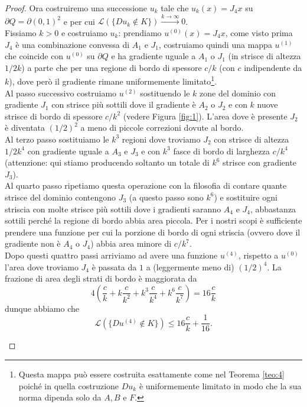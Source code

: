 \documentclass[a4paper,11pt]{book}
\theoremstyle{plain}
\theoremstyle{definition}
\theoremstyle{remark}
\newcommand{\LL}{\mathscr{L}}
\begin{document}
\begin{proof}
	Ora costruiremo una successione $u_k$ tale che $u_k(x) = J_4x$ su $\partial Q = \partial (0,1)^2$ e per cui $\LL(\{Du_k\not\in K\})\xrightarrow{k\to\infty}0$.\\
	Fissiamo $k>0$ e costruiamo $u_k$: prendiamo $u^{(0)}(x) = J_4x$, come visto prima $J_4$ è una combinazione convessa di $A_1$ e $J_1$, costruiamo quindi una mappa $u^{(1)}$ che coincide con $u^{(0)}$ su $\partial Q$ e ha gradiente uguale a $A_1$ o $J_1$ (in strisce di altezza $1/2k$) a parte che per una regione di bordo di spessore $c/k$ (con $c$ indipendente da $k$), dove però il gradiente rimane uniformemente limitato\footnote{Questa mappa può essere costruita esattamente come nel Teorema \ref{teo:4} poiché in quella costruzione $Du_k$ è uniformemente limitato in modo che la sua norma dipenda solo da $A, B$ e $F$.}.\\
	Al passo successivo costruiamo $u^{(2)}$ sostituendo le $k$ zone del dominio con gradiente $J_1$ con strisce più sottili dove il gradiente è $A_2$ o $J_2$ e con $k$ nuove strisce di bordo di spessore $c/k^2$ (vedere Figura \ref{fig:1}). L'area dove è presente $J_2$ è diventata $(1/2)^2$ a meno di piccole correzioni dovute al bordo.\\
	Al terzo passo sostituiamo le $k^3$ regioni dove troviamo $J_2$ con strisce di altezza $1/2k^4$ con gradiente uguale a $A_3$ e $J_3$ e con $k^3$ fasce di bordo di larghezza $c/k^4$ (attenzione: qui stiamo producendo soltanto un totale di $k^6$ strisce con gradiente $J_3$).\\
	Al quarto passo ripetiamo questa operazione con la filosofia di contare quante strisce del dominio contengono $J_3$ (a questo passo sono $k^6$) e sostituire ogni striscia con molte strisce più sottili dove i gradienti saranno $A_4$ e $J_4$, abbastanza sottili perché la regione di bordo abbia area piccola. Per i nostri scopi è sufficiente prendere una funzione per cui la porzione di bordo di ogni striscia (ovvero dove il gradiente non è $A_4$ o $J_4$) abbia area minore di $c/k^7$.\\
	Dopo questi quattro passi arriviamo ad avere una funzione $u^{(4)}$, rispetto a $u^{(0)}$ l'area dove troviamo $J_4$ è passata da $1$ a (leggermente meno di) $(1/2)^4$. La frazione di area degli strati di bordo è maggiorata da
	\[
		4\left(\frac{c}{k} + k\frac{c}{k^2} + k^3\frac{c}{k^4} + k^6\frac{c}{k^7}\right) = 16\frac{c}{k}
	\]
	dunque abbiamo che
	\[
		\LL(\{Du^{(4)}\not \in K\}) \leq 16\frac{c}{k}+\frac{1}{16}.
	\]
	\begin{figure}[H]
	

\end{figure}
\end{proof}
\end{document}
